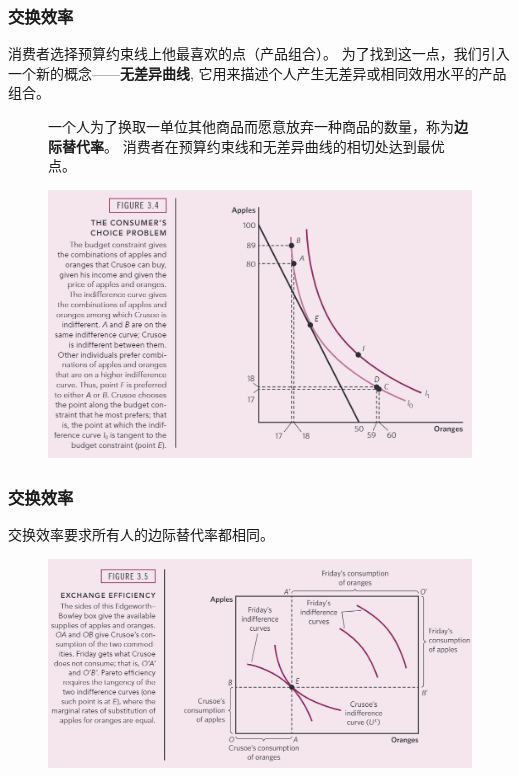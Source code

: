 \documentclass[aspectratio=169, 12pt]{beamer}
\begin{document}
\begin{frame}[plain]
    \frametitle{交换效率}
    消费者选择预算约束线上他最喜欢的点（产品组合）。
    为了找到这一点，我们引入一个新的概念——\textbf{无差异曲线},
    它用来描述个人产生无差异或相同效用水平的产品组合。
    \begin{figure}
        \centering
        \begin{minipage}{0.2\linewidth}
            一个人为了换取一单位其他商品而愿意放弃一种商品的数量，称为\textbf{边际替代率}。
            消费者在预算约束线和无差异曲线的相切处达到最优点。
        \end{minipage}%
        \begin{minipage}{0.1\linewidth}
        { }
        \end{minipage}
        \begin{minipage}{0.7\linewidth}
            \centering
            \includegraphics[width=1.0\textwidth]{./resources/figure/comchoice.png}
        \end{minipage}
    \end{figure}
\end{frame}

\begin{frame}[plain]
    \frametitle{交换效率}
    交换效率要求所有人的边际替代率都相同。
    \begin{figure}
        \centering
        \begin{minipage}{1.0\linewidth}
            \centering
            \includegraphics[width=1.0\textwidth]{./resources/figure/exchangeeff.png}
        \end{minipage}
    \end{figure}
\end{frame}
\end{document}
